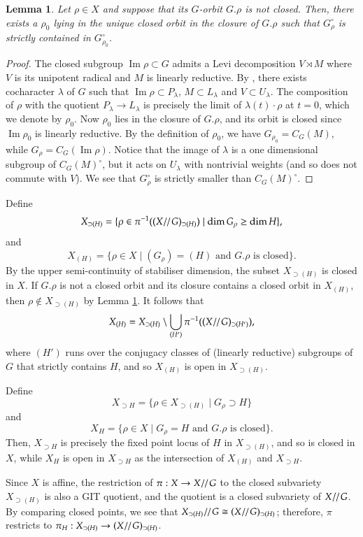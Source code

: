 \documentclass[11pt,oneside,dvipsnames]{amsart}
\theoremstyle{plain}
\newtheorem{Lem}[Thm]{Lemma}
\theoremstyle{definition}
\theoremstyle{named}
\DeclareMathOperator{\Ima}{Im}
\DeclareMathOperator{\ds}{\!/\mkern-2mu/\mkern-2mu}
\begin{document}
\begin{Lem}\label{Lem-noncl-stab}
Let $\rho\in X$ and suppose that its $G$-orbit $G.\rho$ is not closed. Then, there exists a $\rho_0$ lying in the unique closed orbit in the closure of $G.\rho$ such that $G_{\rho}^{\circ}$ is strictly contained in $G_{\rho_0}^{\circ}$.
\end{Lem}
\begin{proof}
The closed subgroup $\Ima\rho\subset G$ admits a Levi decomposition $V\rtimes M$ where $V$ is its unipotent radical and $M$ is linearly reductive. By \cite[Proposition 2.6]{Ri88}, there exists cocharacter $\lambda$ of $G$ such that $\Ima\rho\subset P_{\lambda}$, $M\subset L_{\lambda}$ and $V\subset U_{\lambda}$. The composition of $\rho$ with the quotient $P_{\lambda}\rightarrow L_{\lambda}$ is precisely the limit of $\lambda(t)\cdot \rho$ at $t=0$, which we denote by $\rho_0$. Now $\rho_0$ lies in the closure of $G.\rho$, and its orbit is closed since $\Ima\rho_0$ is linearly reductive. By the definition of $\rho_0$, we have $G_{\rho_0}=C_G(M)$, while $G_{\rho}=C_G(\Ima\rho)$. Notice that the image of $\lambda$ is a one dimensional subgroup of $C_G(M)^{\circ}$, but it acts on $U_{\lambda}$ with nontrivial weights (and so does not commute with $V$). We see that $G_{\rho}^{\circ}$ is strictly smaller than $C_G(M)^{\circ}$.
\end{proof}

Define 
$$
X_{\supset (H)}=\{\rho\in \pi^{-1}((X\ds G)_{\supset (H)})\mid \dim G_{\rho}\ge\dim H\},
$$
and 
$$
X_{(H)}=\{\rho\in X\mid (G_{\rho})=(H)\text{ and $G.\rho$ is closed}\}.
$$
By the upper semi-continuity of stabiliser dimension, the subset $X_{\supset (H)}$ is closed in $X$. If $G.\rho$ is not a closed orbit and its closure contains a closed orbit in $X_{(H)}$, then $\rho\notin X_{\supset(H)}$ by Lemma \ref{Lem-noncl-stab}. It follows that  $$
X_{(H)}=X_{\supset (H)}\setminus\bigcup_{(H')}\pi^{-1}((X\ds G)_{\supset(H')}),
$$
where $(H')$ runs over the conjugacy classes of (linearly reductive) subgroups of $G$ that strictly contains $H$, and so $X_{(H)}$ is open in $X_{\supset(H)}$.

Define 
$$
X_{\supset H}=\{\rho\in X_{\supset(H)}\mid G_{\rho}\supset H\}
$$ 
and 
$$
X_H=\{\rho\in X\mid G_{\rho}=H\text{ and $G.\rho$ is closed}\}.
$$ 
Then, $X_{\supset H}$ is precisely the fixed point locus of $H$ in $X_{\supset(H)}$, and so is closed in $X$, while $X_H$ is open in $X_{\supset H}$ as the intersection of $X_{(H)}$ and $X_{\supset H}$.

Since $X$ is affine, the restriction of $\pi:X\rightarrow X\ds G$ to the closed subvariety $X_{\supset(H)}$ is also a GIT quotient, and the quotient is a closed subvariety of $X\ds G$. By comparing closed points, we see that $X_{\supset(H)}\ds G\cong(X\ds G)_{\supset(H)}$; therefore, $\pi$ restricts to $\pi_H:X_{\supset(H)}\rightarrow(X\ds G)_{\supset(H)}$.
\end{document}
